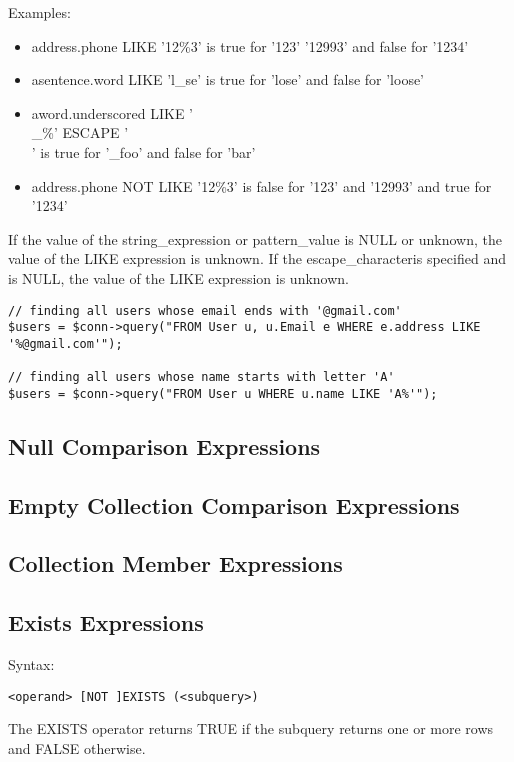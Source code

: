 \documentclass[11pt,a4paper]{report}
\begin{document}
Examples:

\begin{itemize}
\item{address.phone LIKE '12\%3' is true for '123' '12993' and false for '1234'}
\item{asentence.word LIKE 'l\_se' is true for 'lose' and false for 'loose'}
\item{aword.underscored LIKE '\\\_\%' ESCAPE '\\' is true for '\_foo' and false for 'bar'}
\item{address.phone NOT LIKE '12\%3' is false for '123' and '12993' and true for '1234'}
\end{itemize}
If the value of the string\_expression or pattern\_value is NULL or unknown, the value of the LIKE expression is unknown. If the escape\_characteris specified and is NULL, the value of the LIKE expression is unknown.

\begin{verbatim}
// finding all users whose email ends with '@gmail.com'
$users = $conn->query("FROM User u, u.Email e WHERE e.address LIKE '%@gmail.com'");

// finding all users whose name starts with letter 'A'
$users = $conn->query("FROM User u WHERE u.name LIKE 'A%'");
\end{verbatim}

\subsection{Null Comparison Expressions}
\subsection{Empty Collection Comparison Expressions}
\subsection{Collection Member Expressions}
\subsection{Exists Expressions}
Syntax:

\begin{verbatim}
<operand> [NOT ]EXISTS (<subquery>)
\end{verbatim}

The EXISTS operator returns TRUE if the subquery returns one or more rows and FALSE otherwise.
\end{document}
